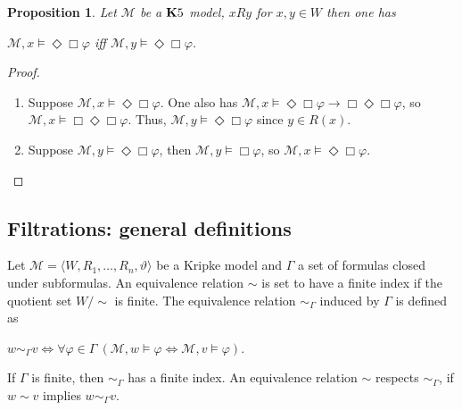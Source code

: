 \documentclass[a4paper]{article}
\theoremstyle{defin}
\theoremstyle{theorem}
\theoremstyle{prop}
\newtheorem{prop}{Proposition}
\theoremstyle{lemma}
\theoremstyle{ex}
\theoremstyle{col}
\begin{document}
\begin{prop} \label{k5useful}
  Let $\mathcal{M}$ be a ${\bf K}5$ model, $x R y$ for $x, y \in W$ then one has
  \begin{center}
    $\mathcal{M}, x \models \Diamond \Box \varphi$ iff $\mathcal{M}, y \models \Diamond \Box \varphi$.
  \end{center}
\end{prop}

\begin{proof}
$ $

  \begin{enumerate}
    \item Suppose $\mathcal{M}, x \models \Diamond \Box \varphi$. One also has $\mathcal{M}, x \models \Diamond \Box \varphi \to \Box \Diamond \Box \varphi$, so $\mathcal{M}, x \models \Box \Diamond \Box \varphi$. Thus, $\mathcal{M}, y \models \Diamond \Box \varphi$ since $y \in R(x)$.
    \item Suppose $\mathcal{M}, y \models \Diamond \Box \varphi$, then $\mathcal{M}, y \models \Box \varphi$, so $\mathcal{M}, x \models \Diamond \Box \varphi$.
  \end{enumerate}
\end{proof}

\subsection{Filtrations: general definitions}

Let $\mathcal{M} = \langle W, R_1, \dots, R_n, \vartheta \rangle$ be a Kripke model and $\Gamma$ a set of formulas closed under subformulas. An equivalence relation $\sim$ is set to have a finite index if the quotient set $W / \sim$ is finite. The equivalence relation $\sim_{\Gamma}$ induced by $\Gamma$ is defined as

\begin{center}
  $w \sim_{\Gamma} v \Leftrightarrow \forall \varphi \in \Gamma \: (\mathcal{M}, w \models \varphi \Leftrightarrow \mathcal{M}, v \models \varphi)$.
\end{center}

If $\Gamma$ is finite, then $\sim_{\Gamma}$ has a finite index. An equivalence relation $\sim$ respects $\sim_{\Gamma}$, if $w \sim v$ implies $w \sim_{\Gamma} v$.
\end{document}
